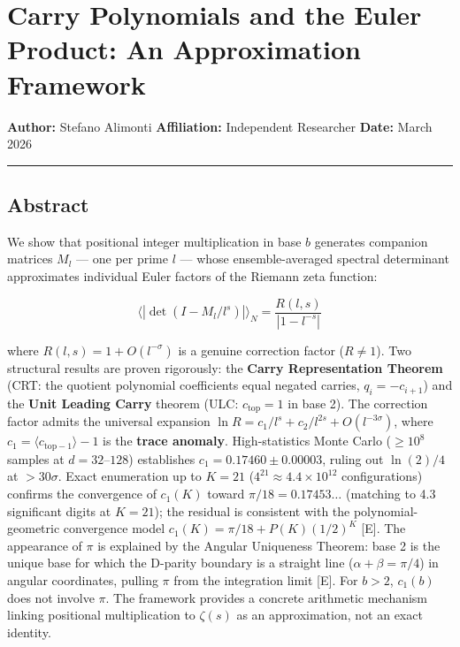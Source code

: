 \documentclass[
  11pt,
]{article}
\author{Stefano Alimonti --- stefalimonti@gmail.com}
\date{March 2026}
\begin{document}
{
\hypersetup{linkcolor=black}
\setcounter{tocdepth}{2}
\tableofcontents
}
\section{Carry Polynomials and the Euler Product: An Approximation
Framework}\label{carry-polynomials-and-the-euler-product-an-approximation-framework}

\textbf{Author:} Stefano Alimonti \textbf{Affiliation:} Independent Researcher
\textbf{Date:} March 2026

\begin{center}\rule{0.5\linewidth}{0.5pt}\end{center}

\newpage

\subsection{Abstract}\label{abstract}

We show that positional integer multiplication in base \(b\) generates companion
matrices \(M_l\) --- one per prime \(l\) --- whose ensemble-averaged spectral
determinant approximates individual Euler factors of the Riemann zeta function:

\[\langle|\det(I - M_l/l^s)|\rangle_N = \frac{R(l,s)}{|1 - l^{-s}|}\]

where \(R(l,s) = 1 + O(l^{-\sigma})\) is a genuine correction factor
(\(R \neq 1\)). Two structural results are proven rigorously: the \textbf{Carry
Representation Theorem} (CRT: the quotient polynomial coefficients equal negated
carries, \(q_i = -c_{i+1}\)) and the \textbf{Unit Leading Carry} theorem (ULC:
\(c_{\text{top}} = 1\) in base 2). The correction factor admits the universal
expansion \(\ln R = c_1/l^s + c_2/l^{2s} + O(l^{-3\sigma})\), where
\(c_1 = \langle c_{\text{top}-1}\rangle - 1\) is the \textbf{trace anomaly}.
High-statistics Monte Carlo (\(\geq 10^8\) samples at \(d = 32\)--\(128\))
establishes \(c_1 = 0.17460 \pm 0.00003\), ruling out \(\ln(2)/4\) at
\(> 30\sigma\). Exact enumeration up to \(K = 21\)
(\(4^{21} \approx 4.4 \times 10^{12}\) configurations) confirms the convergence
of \(c_1(K)\) toward \(\pi/18 = 0.17453\ldots\) (matching to 4.3 significant
digits at \(K = 21\)); the residual is consistent with the polynomial-geometric
convergence model \(c_1(K) = \pi/18 + P(K)(1/2)^K\) {[}E{]}. The appearance of
\(\pi\) is explained by the Angular Uniqueness Theorem: base 2 is the unique
base for which the D-parity boundary is a straight line
(\(\alpha + \beta = \pi/4\)) in angular coordinates, pulling \(\pi\) from the
integration limit {[}E{]}. For \(b > 2\), \(c_1(b)\) does not involve \(\pi\).
The framework provides a concrete arithmetic mechanism linking positional
multiplication to \(\zeta(s)\) as an approximation, not an exact identity.
\end{document}
